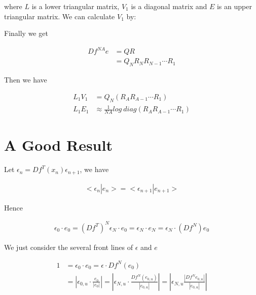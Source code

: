 \documentclass{article}
\begin{document}
where $L$ is a lower triangular matrix, $V_1$ is a diagonal matrix and $E$ is an upper triangular matrix. We can calculate $V_1$ by:

Finally we get

\begin{align}
    Df^{NA}e &= QR \\
    &= Q_NR_NR_{N-1}\cdots R_1
\end{align}

Then we have

\begin{align}
    L_1V_1 &= Q_N(R_AR_{A-1}\cdots R_1) \\
    L_1E_1 &\approx \frac{1}{NA}log~diag(R_AR_{A-1}\cdots R_1)
\end{align}

\section*{A Good Result}

Let $\epsilon_n = Df^T(x_n)\epsilon_{n+1}$, we have

\begin{align}
    <\epsilon_n | e_n> = <\epsilon_{n+1} | e_{n+1}>
\end{align}

Hence

\begin{align}
    \epsilon_0\cdot e_0 = (Df^T)^N \epsilon_N\cdot e_0=\epsilon_N\cdot e_N=\epsilon_N\cdot(Df^N)e_0
\end{align}

We just consider the several front lines of $\epsilon$ and $e$

\begin{align}
    1 &= \epsilon_0\cdot e_0 = \epsilon\cdot Df^N(e_0) \\
    &= |\epsilon_{0,u}\cdot\frac{e_0}{|e_0|}|=|\epsilon_{N,u}\cdot\frac{Df^N(e_{0,u})}{|e_{0,u}|}|=|\epsilon_{N,u}\frac{|Df^N{e_{0,u}}|}{|e_{0,u}|}|
\end{align}
\end{document}
